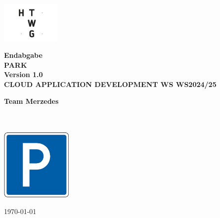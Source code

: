 \begin{titlepage}
    \begin{center}
        \vspace{0.5cm}
        
        \includegraphics[height=2cm]{resources/htwg-logo.png}
        
        \vspace{1.5cm}

        \Huge{\textbf{Endabgabe\\}}
        \vspace{0.5cm}
        \Huge{\textbf{PARK \\ Version 1.0 \\}}
        \vspace{0.5cm}
        \Huge{\textbf{CLOUD APPLICATION DEVELOPMENT WS WS2024/25}}
    
        \vspace{1.5cm}
 
        \Large{
            \textbf{Team Merzedes} \\
            \href{mailto:jonas.elsper@htwg-konstanz.de}{\authorjonas} \\
            \href{mailto:lukas.benner@htwg-konstanz.de}{\authorlukasb} \\
            \href{mailto:lukas.epple@htwg-konstanz.de}{\authorlukase}
        }
 
        \vspace{1.5cm}
        
        \includegraphics[height=3.5cm]{resources/logo.png}

        \vspace{1.5cm}

        \large{\today}
      
    \end{center}
 \end{titlepage}

\newpage
